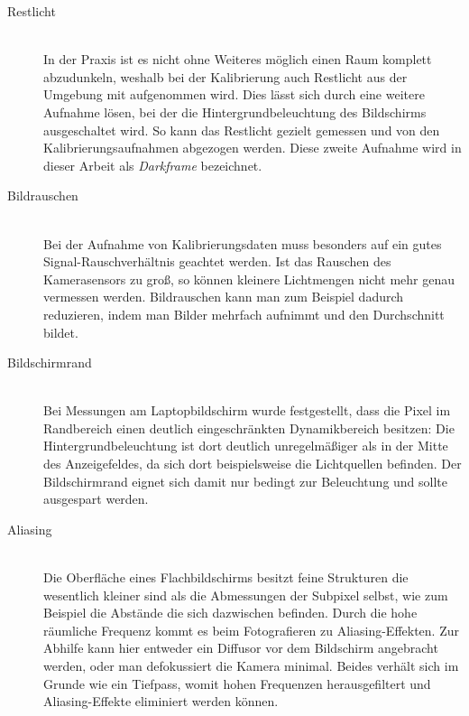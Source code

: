    \begin{description}

     \item[Restlicht] \hfill \\
        In der Praxis ist es nicht ohne Weiteres möglich einen Raum komplett abzudunkeln, weshalb bei der Kalibrierung auch Restlicht aus der Umgebung mit aufgenommen wird.
        Dies lässt sich durch eine weitere Aufnahme lösen, bei der die Hintergrundbeleuchtung des Bildschirms ausgeschaltet wird.
        So kann das Restlicht gezielt gemessen und von den Kalibrierungsaufnahmen abgezogen werden. 
        Diese zweite Aufnahme wird in dieser Arbeit als \emph{Darkframe} bezeichnet.

     \item[Bildrauschen] \hfill \\
        Bei der Aufnahme von Kalibrierungsdaten muss besonders auf ein gutes Signal-Rauschverhältnis geachtet werden. 
        Ist das Rauschen des Kamerasensors zu groß, so können kleinere Lichtmengen nicht mehr genau vermessen werden.
        Bildrauschen kann man zum Beispiel dadurch reduzieren, indem man Bilder mehrfach aufnimmt und den Durchschnitt bildet.

     \item[Bildschirmrand] \hfill \\ 
        Bei Messungen am Laptopbildschirm wurde festgestellt, dass die Pixel im Randbereich einen deutlich eingeschränkten Dynamikbereich besitzen:  
        Die Hintergrundbeleuchtung ist dort deutlich unregelmäßiger als in der Mitte des Anzeigefeldes, da sich dort beispielsweise die Lichtquellen befinden.
        Der Bildschirmrand eignet sich damit nur bedingt zur Beleuchtung und sollte ausgespart werden.

     \item[Aliasing] \hfill \\
        Die Oberfläche eines Flachbildschirms besitzt feine Strukturen die wesentlich kleiner sind als die Abmessungen der Subpixel selbst, wie zum Beispiel die Abstände die sich dazwischen befinden.
        Durch die hohe räumliche Frequenz kommt es beim Fotografieren zu Aliasing-Effekten. 
        Zur Abhilfe kann hier entweder ein Diffusor vor dem Bildschirm angebracht werden, oder man defokussiert die Kamera minimal.
        Beides verhält sich im Grunde wie ein Tiefpass, womit hohen Frequenzen herausgefiltert und Aliasing-Effekte eliminiert werden können. 

   \end{description} 


